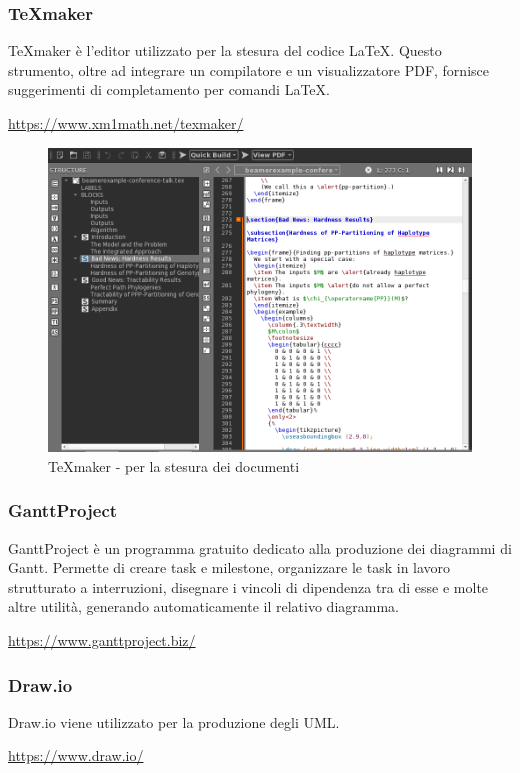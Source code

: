 \subsubsection{\TeX{}maker}
\TeX{}maker è l'editor utilizzato per la stesura del codice \LaTeX{}. Questo strumento, oltre ad integrare un compilatore e un visualizzatore PDF, fornisce suggerimenti di completamento per comandi \LaTeX{}. \\
\centerline{\url{https://www.xm1math.net/texmaker/}}
\begin{figure}[H]
	\includegraphics[width=0.99\linewidth]{../Norme_di_progetto/img/texMaker.png}
	\caption{\TeX{}maker - per la stesura dei documenti}
\end{figure}

\subsubsection{GanttProject}
GanttProject è un programma gratuito dedicato alla produzione dei diagrammi di Gantt\glo. Permette di creare task e milestone, organizzare le task in lavoro strutturato a interruzioni, disegnare
i vincoli di dipendenza tra di esse e molte altre utilità, generando automaticamente il relativo
diagramma. \\
\centerline{\url{https://www.ganttproject.biz/}}

\subsubsection{Draw.io}
Draw.io viene utilizzato per la produzione degli UML.\\
\centerline{\url{https://www.draw.io/}} 


